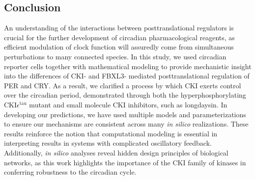 \subsection{Conclusion}
An understanding of the interactions between posttranslational regulators is
crucial for the further development of circadian pharmacological reagents, as
efficient modulation of clock function will assuredly come from simultaneous
perturbations to many connected species. In this study, we used circadian
reporter cells together with mathematical modeling to provide mechanistic
insight into the differences of CKI- and FBXL3- mediated posttranslational
regulation of PER and CRY. As a result, we clarified a process by which CKI
exerts control over the circadian period, demonstrated through both the
hyperphosphorylating CKI$\epsilon^\mathrm{tau}$ mutant and small molecule CKI
inhibitors, such as longdaysin. In developing our predictions, we have used
multiple models and parameterizations to ensure our mechanisms are consistent
across many {\it in silico} realizations. These results reinforce the notion
that computational modeling is essential in interpreting results in systems
with complicated oscillatory feedback. Additionally, {\it in silico} analyses
reveal hidden design principles of biological networks, as this work highlights
the importance of the CKI family of kinases in conferring robustness to the
circadian cycle. 
 


